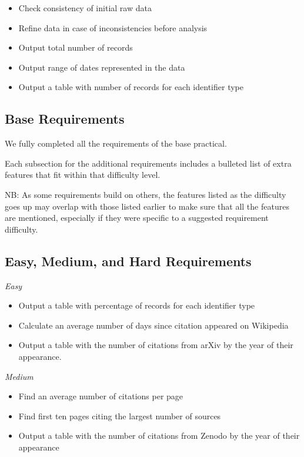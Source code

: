 \documentclass[12pt,a4paper,final]{article}
\begin{document}
\begin{itemize}[noitemsep]
    \item Check consistency of initial raw data
    \item Refine data in case of inconsistencies before analysis
    \item Output total number of records
    \item Output range of dates represented in the data
    \item Output a table with number of records for each identifier type
\end{itemize}


\subsection*{Base Requirements}

We fully completed all the requirements of the base practical.

Each subsection for the additional requirements includes a bulleted list of
extra features that fit within that difficulty level.

NB: As some requirements build on others, the features listed as the difficulty goes
up may overlap with those listed earlier to make sure that all the features are mentioned,
especially if they were specific to a suggested requirement difficulty.

\subsection*{Easy, Medium, and Hard Requirements}
\begin{center} \emph{Easy} \end{center}
\begin{itemize}[noitemsep]
    \item Output a table with percentage of records for each identifier type
    \item Calculate an average number of days since citation appeared on Wikipedia
    \item Output a table with the number of citations from arXiv by the year of their appearance.
\end{itemize}

\begin{center} \emph{Medium} \end{center}
\begin{itemize}[noitemsep]
    \item Find an average number of citations per page
    \item Find first ten pages citing the largest number of sources
    \item Output a table with the number of citations from Zenodo by the year of their appearance
\end{itemize}
\end{document}
